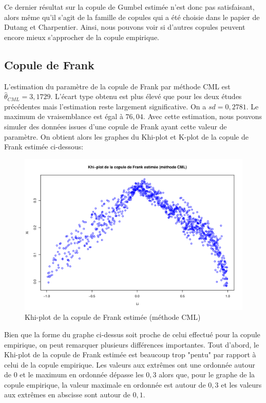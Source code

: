 Ce dernier résultat sur la copule de Gumbel estimée n'est donc pas satisfaisant, alors même qu'il s'agit de la famille de copules qui a été choisie dans le papier de Dutang et Charpentier. Ainsi, nous pouvons voir si d'autres copules peuvent encore mieux s'approcher de la copule empirique.

\subsection{Copule de Frank}

L'estimation du paramètre de la copule de Frank par méthode CML est $\widehat{\theta}_{CML}=3,1729$. L'écart type obtenu est plus élevé que pour les deux études précédentes mais l'estimation reste largement significative. On a $sd = 0,2781$. Le maximum de vraisemblance est égal à $76,04$. Avec cette estimation, nous pouvons simuler des données issues d'une copule de Frank ayant cette valeur de paramètre. On obtient alors les graphes du Khi-plot et K-plot de la copule de Frank estimée ci-dessous:

\noindent%
\begin{figure}[H]
    \begin{center}
      \includegraphics[width=17 cm, angle=0]{./pictures/frankcmlkhiplot.png}
      \centering\caption{\label{2}Khi-plot de la copule de Frank estimée (méthode CML)}
    \end{center}
\end{figure}

Bien que la forme du graphe ci-dessus soit proche de celui effectué pour la copule empirique, on peut remarquer plusieurs différences importantes. Tout d'abord, le Khi-plot de la copule de Frank estimée est beaucoup trop "pentu" par rapport à celui de la copule empirique. Les valeurs aux extrêmes ont une ordonnée autour de $0$ et le maximum en ordonnée dépasse les $0,3$ alors que, pour le graphe de la copule empirique, la valeur maximale en ordonnée est autour de $0,3$ et les valeurs aux extrêmes en abscisse sont autour de $0,1$.

